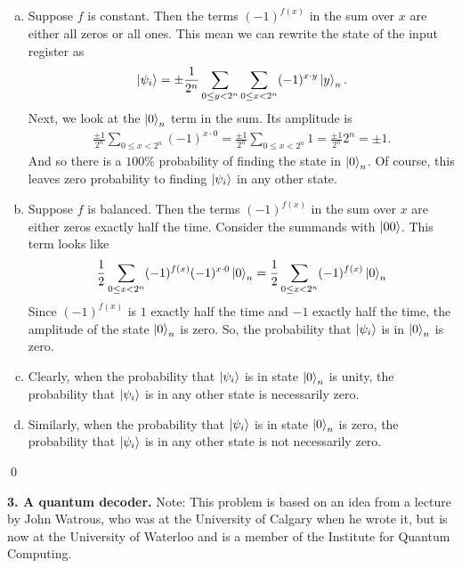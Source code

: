 \documentclass{book}
\theoremstyle{definition}
\newcommand{\f}[2]{\frac{#1}{#2}}
\begin{document}
\begin{enumerate}[(a)]
	\item Suppose $f$ is constant. Then the terms  $(-1)^{f(x)}$ in the sum over $x$ are either all zeros or all ones. This mean we can rewrite the state of the input register as  
	\begin{align}
	\ket{\psi_i} = \pm \f{1}{2^n} \sum_{0\leq y < 2^n} \sum_{0\leq x < 2^n}(-1)^{x\cdot y}\ket{y}_n.
	\end{align}
	Next, we look at the $\ket{0}_n$ term in the sum. Its amplitude is \
	\begin{align}
	\f{\pm 1}{2^n}\sum_{0 \leq x < 2^n} (-1)^{x\cdot 0} = \f{\pm 1}{2^n}\sum_{0 \leq x < 2^n} 1 = \f{\pm 1}{2^n} 2^n = \pm 1.
	\end{align}
	And so there is a $100\%$ probability of finding the state in $\ket{0}_n$. Of course, this leaves zero probability to finding $\ket{\psi_i}$ in any other state. 
	
	

	\item  Suppose $f$ is balanced. Then the terms  $(-1)^{f(x)}$ in the sum over $x$ are either zeros exactly half the time. Consider the summands with $\ket{00}$. This term looks like
	\begin{align}
	\f{1}{2}\sum_{0 \leq x < 2^n} (-1)^{f(x)}(-1)^{x\cdot 0} \ket{0}_n = \f{1}{2}\sum_{0 \leq x < 2^n} (-1)^{f(x)} \ket{0}_n
	\end{align}
	Since $(-1)^{f(x)}$ is $1$ exactly half the time and $-1$ exactly half the time, the amplitude of the state $\ket{0}_n$ is zero. So, the probability that $\ket{\psi_i}$ is in $\ket{0}_n$ is zero.
	
	
	\item Clearly, when the probability that $\ket{\psi_i}$ is in state $\ket{0}_n$ is unity, the probability that $\ket{\psi_i}$ is in any other state is necessarily zero.
	
	
	
	\item Similarly, when the probability that $\ket{\psi_i}$ is in state $\ket{0}_n$ is zero, the probability that $\ket{\psi_i}$ is in any other state is not necessarily zero.
	
\end{enumerate}




\qed


\newpage


\noindent \textbf{3. A quantum decoder.}  Note: This problem is based on an idea from a lecture by John Watrous, who was at the University of Calgary when he wrote it, but is now at the University of Waterloo and is a member of the Institute for Quantum Computing.
\end{document}
